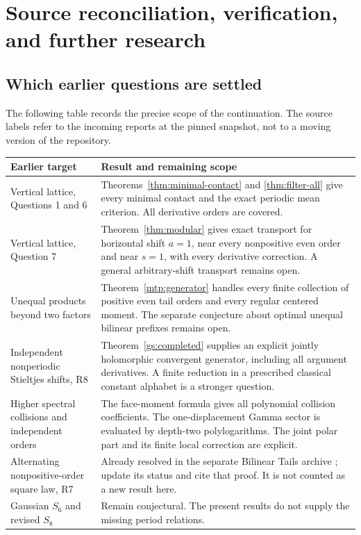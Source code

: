 \section{Source reconciliation, verification, and further research}
\label{sec:audit}

\subsection{Which earlier questions are settled}

The following table records the precise scope of the continuation.
The source labels refer to the incoming reports at the pinned
snapshot, not to a moving version of the repository.

\begin{longtable}{@{}>{\raggedright\arraybackslash}p{}>{\raggedright\arraybackslash}p{}@{}}
\toprule
\textbf{Earlier target} & \textbf{Result and remaining scope}\\
\midrule
\endhead
Vertical lattice, Questions 1 and 6 \cite{RepoVertical}
&
Theorems~\ref{thm:minimal-contact} and \ref{thm:filter-all}
give every minimal contact and the exact periodic mean criterion.
All derivative orders are covered.\\[5pt]
Vertical lattice, Question 7 \cite{RepoVertical}
&
Theorem~\ref{thm:modular} gives exact transport for horizontal
shift \(a=1\), near every nonpositive even order and near \(s=1\),
with every derivative correction. A general arbitrary-shift
transport remains open.\\[5pt]
Unequal products beyond two factors \cite{RepoBernoulli,RepoMixed}
&
Theorem~\ref{mtp:generator} handles every finite collection of
positive even tail orders and every regular centered moment.
The separate conjecture about optimal unequal bilinear
prefixes remains open.\\[5pt]
Independent nonperiodic Stieltjes shifts, R8 \cite{RepoTailKernels}
&
Theorem~\ref{gs:completed} supplies an explicit jointly
holomorphic convergent generator, including all argument
derivatives. A finite reduction in a prescribed classical
constant alphabet is a stronger question.\\[5pt]
Higher spectral collisions and independent orders
\cite{RepoBernoulli}
&
The face-moment formula gives all polynomial collision
coefficients. The one-displacement Gamma sector is evaluated
by depth-two polylogarithms. The joint polar part and its
finite local correction are explicit.\\[5pt]
Alternating nonpositive-order square law, R7
\cite{RepoTailKernels}
&
Already resolved in the separate Bilinear Tails archive
\cite{RepoBilinear}; update its status and cite that
proof. It is not counted as a new result here.\\[5pt]
Gaussian \(S_6\) and revised \(S_8\)
\cite{RepoManuscript}
&
Remain conjectural. The present results do not supply the
missing period relations.\\
\bottomrule
\end{longtable}

